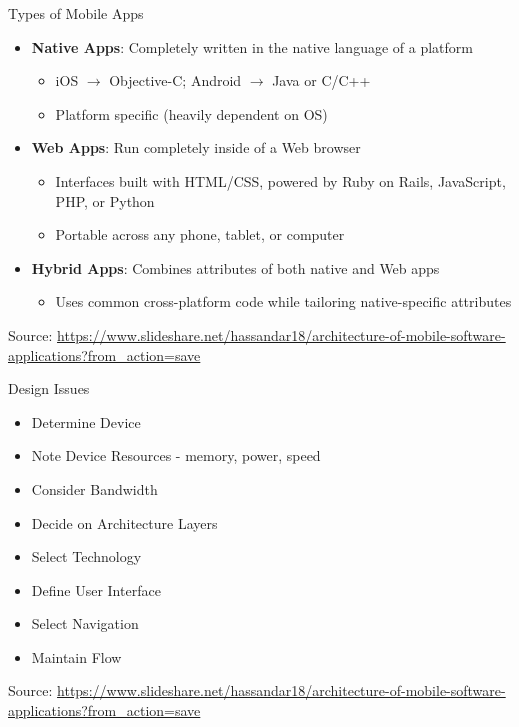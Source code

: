 \documentclass[aspectratio=169, xcolor=dvipsnames]{beamer}
\begin{document}
\begin{frame}{Types of Mobile Apps}
    \begin{itemize}[<+->]
        \item \textbf{Native Apps}: Completely written in the native language of a platform
        \begin{itemize}
            \item[$\triangleright$] iOS $\rightarrow$ Objective-C; Android $\rightarrow$ Java or C/C++
            \item[$\triangleright$] Platform specific (heavily dependent on OS)
        \end{itemize}
        \item \textbf{Web Apps}: Run completely inside of a Web browser
        \begin{itemize}
            \item[$\triangleright$] Interfaces built with HTML/CSS, powered by Ruby on Rails, JavaScript, PHP, or Python
            \item[$\triangleright$] Portable across any phone, tablet, or computer
        \end{itemize}
        \item \textbf{Hybrid Apps}: Combines attributes of both native and Web apps
        \begin{itemize}
            \item[$\triangleright$] Uses common cross-platform code while tailoring native-specific attributes
        \end{itemize}
    \end{itemize}
    \small Source: \url{https://www.slideshare.net/hassandar18/architecture-of-mobile-software-applications?from_action=save}
\end{frame}

\begin{frame}{Design Issues}
    \begin{itemize}[<+->]
        \item Determine Device
        \item Note Device Resources - memory, power, speed
        \item Consider Bandwidth
        \item Decide on Architecture Layers
        \item Select Technology
        \item Define User Interface
        \item Select Navigation
        \item Maintain Flow
    \end{itemize}
    \vspace{2em}
    \small Source: \url{https://www.slideshare.net/hassandar18/architecture-of-mobile-software-applications?from_action=save}
\end{frame}
\end{document}
